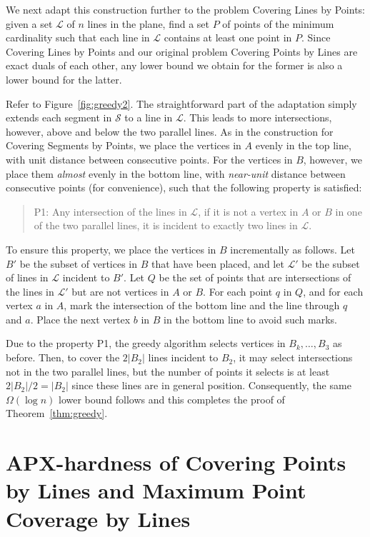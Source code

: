 \documentclass[letterpaper,11pt]{article}
\def\L{{\mathcal L}}
\def\S{{\mathcal S}}
\begin{document}
We next adapt this construction further to the problem
{\sc Covering Lines by Points}:
given a set $\L$ of $n$ lines in the plane,
find a set $P$ of points of the minimum cardinality such that
each line in $\L$ contains at least one point in $P$.
Since {\sc Covering Lines by Points} and 
our original problem {\sc Covering Points by Lines} 
are exact duals of each other, any lower bound we obtain for the
former is also a lower bound for the latter.

Refer to Figure~\ref{fig:greedy2}.
The straightforward part of the adaptation simply extends each segment
in $\S$ to a line in $\L$. This leads to more intersections, however,
above and below the two parallel lines.
As in the construction for {\sc Covering Segments by Points},
we place the vertices in $A$ evenly in the top line,
with unit distance between consecutive points.
For the vertices in $B$, however, we place them \emph{almost} evenly in
the bottom line, with \emph{near-unit} distance between consecutive
points (for convenience),
such that the following property is satisfied:
\begin{quote}
P1: Any intersection of the lines in $\L$,
if it is not a vertex in $A$ or $B$ in one of the two parallel lines,
it is incident to exactly two lines in $\L$.
\end{quote}

To ensure this property, we place the vertices in $B$ incrementally
as follows.
Let $B'$ be the subset of vertices in $B$ that have been placed,
and let $\L'$ be the subset of lines in $\L$ incident to $B'$.
Let $Q$ be the set of points that are intersections of the lines in $\L'$
but are not vertices in $A$ or $B$.
For each point $q$ in $Q$, and for each vertex $a$ in $A$,
mark the intersection of the bottom line and the line through $q$ and $a$.
Place the next vertex $b$ in $B$ in the bottom line to avoid such marks.

Due to the property P1, the greedy algorithm selects vertices in
$B_k,\ldots,B_3$ as before. Then, to cover the $2|B_2|$ lines incident to $B_2$,
it may select intersections not in the two parallel lines, but the number
of points it selects is at least $2|B_2|/2 = |B_2|$
since these lines are in general position.
Consequently, the same $\Omega(\log n)$ lower bound follows and this
completes the proof of Theorem~\ref{thm:greedy}. 




\section{APX-hardness of {\sc Covering Points by Lines} and 
{\sc Maximum Point Coverage by Lines}}
\end{document}
